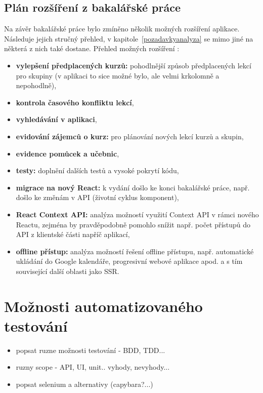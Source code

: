 \section{Plán rozšíření z bakalářské práce}
Na závěr bakalářské práce bylo zmíněno několik možných rozšíření aplikace. Následuje jejich stručný přehled, v kapitole~\ref{pozadavkyanalyza} se mimo jiné na některá z nich také dostane.
Přehled možných rozšíření \cite{bp}:
\begin{itemize}
    \item \textbf{vylepšení předplacených kurzů:} pohodlnější způsob předplacených lekcí pro skupiny (v aplikaci to sice možné bylo, ale velmi krkolomně a nepohodlně),
    \item \textbf{kontrola časového konfliktu lekcí},
    \item \textbf{vyhledávání v aplikaci},
    \item \textbf{evidování zájemců o kurz:} pro plánování nových lekcí kurzů a skupin,
    \item \textbf{evidence pomůcek a učebnic},
    \item \textbf{testy:} doplnění dalších testů a vysoké pokrytí kódu,
    \item \textbf{migrace na nový React:} k vydání došlo ke konci bakalářské práce, např. došlo ke změnám v API (životní cyklus komponent),
    \item \textbf{React Context API:} analýza možností využití Context API v rámci nového Reactu, zejména by pravděpodobně pomohlo snížit např. počet přístupů do API z klientské části napříč aplikací,
    \item \textbf{offline přístup:} analýza možností řešení offline přístupu, např. automatické ukládání do Google kalendáře, progresivní webové aplikace apod. a s tím související další oblasti jako SSR.
\end{itemize}

\chapter{Možnosti automatizovaného testování}

\begin{itemize}
\item popsat ruzne možnosti testování - BDD, TDD...
\end{itemize}
\begin{itemize}
\item ruzny scope - API, UI, unit.. vyhody, nevyhody...
\end{itemize}
\begin{itemize}
\item popsat selenium a alternativy (capybara?...)
\end{itemize}


